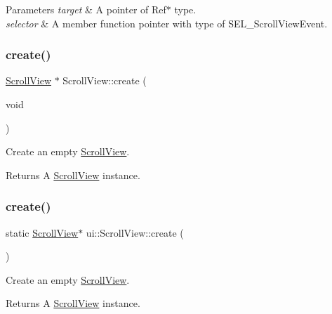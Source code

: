 \begin{DoxyParams}{Parameters}
{\em target} & A pointer of {\ttfamily Ref$\ast$} type. \\
\hline
{\em selector} & A member function pointer with type of {\ttfamily S\+E\+L\+\_\+\+Scroll\+View\+Event}. \\
\hline
\end{DoxyParams}
\mbox{\label{classui_1_1ScrollView_a67c16969c9f515d00488fb58dd8318a3}} 
\subsubsection{\texorpdfstring{create()}{create()}\hspace{0.1cm}{\footnotesize\ttfamily [1/2]}}
{\footnotesize\ttfamily \hyperlink{classui_1_1ScrollView}{Scroll\+View} $\ast$ Scroll\+View\+::create (\begin{DoxyParamCaption}\item[{void}]{ }\end{DoxyParamCaption})\hspace{0.3cm}{\ttfamily [static]}}

Create an empty \hyperlink{classui_1_1ScrollView}{Scroll\+View}. \begin{DoxyReturn}{Returns}
A \hyperlink{classui_1_1ScrollView}{Scroll\+View} instance. 
\end{DoxyReturn}
\mbox{\label{classui_1_1ScrollView_aa8b6477b537926b7da62c999562b1d5c}} 
\subsubsection{\texorpdfstring{create()}{create()}\hspace{0.1cm}{\footnotesize\ttfamily [2/2]}}
{\footnotesize\ttfamily static \hyperlink{classui_1_1ScrollView}{Scroll\+View}$\ast$ ui\+::\+Scroll\+View\+::create (\begin{DoxyParamCaption}{ }\end{DoxyParamCaption})\hspace{0.3cm}{\ttfamily [static]}}

Create an empty \hyperlink{classui_1_1ScrollView}{Scroll\+View}. \begin{DoxyReturn}{Returns}
A \hyperlink{classui_1_1ScrollView}{Scroll\+View} instance. 
\end{DoxyReturn}
\mbox{\label{classui_1_1ScrollView_adda46d15b5742af6e64a96b23c3ca10a}} 
